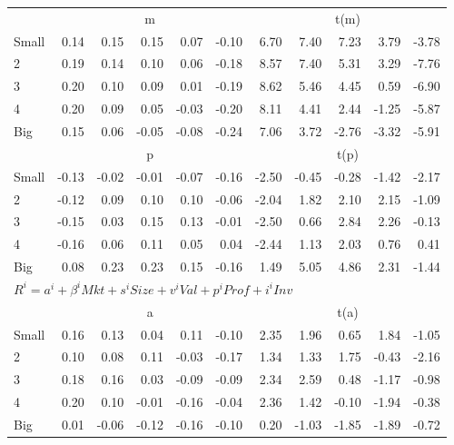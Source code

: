 \begin{tabular}{lrrrrrrrrrr}
  
     & \multicolumn{5}{c}{m} & \multicolumn{5}{c}{t(m)}   \\
     \cmidrule(r){2-6} \cmidrule(r){7-11} 
    Small  & 0.14  & 0.15  & 0.15  & 0.07  & -0.10  & 6.70  & 7.40  & 7.23  & 3.79  & -3.78   \\
    2  & 0.19  & 0.14  & 0.10  & 0.06  & -0.18  & 8.57  & 7.40  & 5.31  & 3.29  & -7.76   \\
    3  & 0.20  & 0.10  & 0.09  & 0.01  & -0.19  & 8.62  & 5.46  & 4.45  & 0.59  & -6.90   \\
    4  & 0.20  & 0.09  & 0.05  & -0.03  & -0.20  & 8.11  & 4.41  & 2.44  & -1.25  & -5.87   \\
    Big  & 0.15  & 0.06  & -0.05  & -0.08  & -0.24  & 7.06  & 3.72  & -2.76  & -3.32  & -5.91   \\
    
  
     & \multicolumn{5}{c}{p} & \multicolumn{5}{c}{t(p)}   \\
     \cmidrule(r){2-6} \cmidrule(r){7-11} 
    Small  & -0.13  & -0.02  & -0.01  & -0.07  & -0.16  & -2.50  & -0.45  & -0.28  & -1.42  & -2.17   \\
    2  & -0.12  & 0.09  & 0.10  & 0.10  & -0.06  & -2.04  & 1.82  & 2.10  & 2.15  & -1.09   \\
    3  & -0.15  & 0.03  & 0.15  & 0.13  & -0.01  & -2.50  & 0.66  & 2.84  & 2.26  & -0.13   \\
    4  & -0.16  & 0.06  & 0.11  & 0.05  & 0.04  & -2.44  & 1.13  & 2.03  & 0.76  & 0.41   \\
    Big  & 0.08  & 0.23  & 0.23  & 0.15  & -0.16  & 1.49  & 5.05  & 4.86  & 2.31  & -1.44   \\
    

  \midrule
  \multicolumn{11}{l}{$R^i=a^i+\beta^iMkt+s^iSize+v^iVal+p^iProf+i^iInv$}  \\
  
     & \multicolumn{5}{c}{a} & \multicolumn{5}{c}{t(a)}   \\
     \cmidrule(r){2-6} \cmidrule(r){7-11} 
    Small  & 0.16  & 0.13  & 0.04  & 0.11  & -0.10  & 2.35  & 1.96  & 0.65  & 1.84  & -1.05   \\
    2  & 0.10  & 0.08  & 0.11  & -0.03  & -0.17  & 1.34  & 1.33  & 1.75  & -0.43  & -2.16   \\
    3  & 0.18  & 0.16  & 0.03  & -0.09  & -0.09  & 2.34  & 2.59  & 0.48  & -1.17  & -0.98   \\
    4  & 0.20  & 0.10  & -0.01  & -0.16  & -0.04  & 2.36  & 1.42  & -0.10  & -1.94  & -0.38   \\
    Big  & 0.01  & -0.06  & -0.12  & -0.16  & -0.10  & 0.20  & -1.03  & -1.85  & -1.89  & -0.72   \\

  \bottomrule
\end{tabular}
